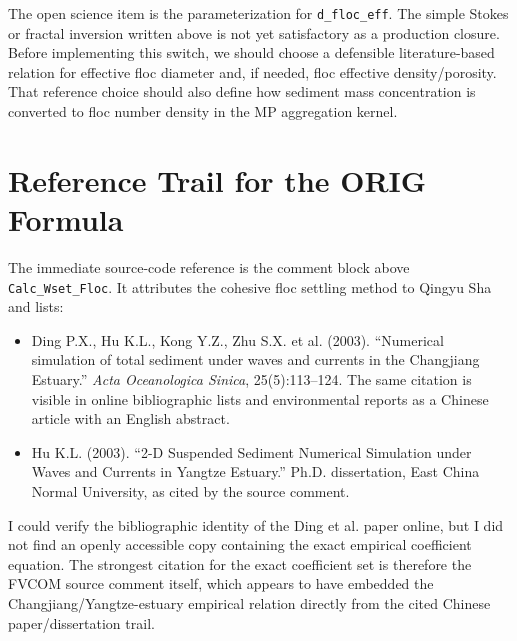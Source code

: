 \documentclass[11pt]{article}
\begin{document}
The open science item is the parameterization for
\texttt{d\_floc\_eff}.  The simple Stokes or fractal inversion written above is
not yet satisfactory as a production closure.  Before implementing this switch,
we should choose a defensible literature-based relation for effective floc
diameter and, if needed, floc effective density/porosity.  That reference
choice should also define how sediment mass concentration is converted to floc
number density in the MP aggregation kernel.

\section*{Reference Trail for the ORIG Formula}

The immediate source-code reference is the comment block above
\texttt{Calc\_Wset\_Floc}.  It attributes the cohesive floc settling method to
Qingyu Sha and lists:
\begin{itemize}
  \item Ding P.X., Hu K.L., Kong Y.Z., Zhu S.X. et al. (2003).
        ``Numerical simulation of total sediment under waves and currents in
        the Changjiang Estuary.'' \textit{Acta Oceanologica Sinica},
        25(5):113--124.  The same citation is visible in online bibliographic
        lists and environmental reports as a Chinese article with an English
        abstract.
  \item Hu K.L. (2003). ``2-D Suspended Sediment Numerical Simulation under
        Waves and Currents in Yangtze Estuary.'' Ph.D. dissertation, East
        China Normal University, as cited by the source comment.
\end{itemize}

I could verify the bibliographic identity of the Ding et al. paper online, but
I did not find an openly accessible copy containing the exact empirical
coefficient equation.  The strongest citation for the exact coefficient set is
therefore the FVCOM source comment itself, which appears to have embedded the
Changjiang/Yangtze-estuary empirical relation directly from the cited Chinese
paper/dissertation trail.
\end{document}
